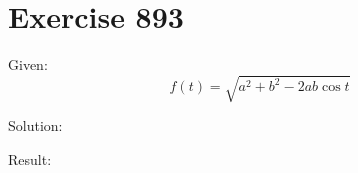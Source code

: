 \documentclass[a4paper, 10pt]{scrartcl}
\begin{document}
\section{Exercise 893}

Given:
\[
f(t) = \sqrt{a^{2} + b^{2} - 2ab\cos{t}}
\]

Solution:

Result:
\end{document}
